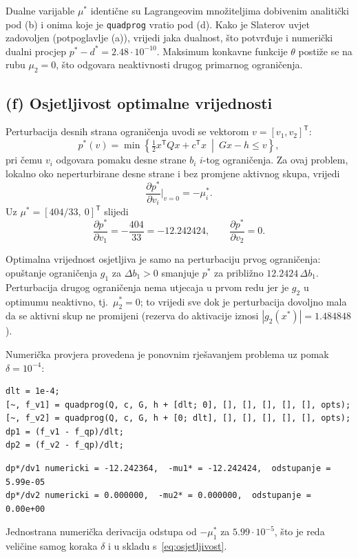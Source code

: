 Dualne varijable $\mu^*$ identične su Lagrangeovim množiteljima dobivenim analitički pod (b) i onima koje je \texttt{quadprog} vratio pod (d). Kako je Slaterov uvjet zadovoljen (potpoglavlje (a)), vrijedi jaka dualnost, što potvrđuje i numerički dualni procjep $p^* - d^* = 2.48 \cdot 10^{-10}$. Maksimum konkavne funkcije $\theta$ postiže se na rubu $\mu_2 = 0$, što odgovara neaktivnosti drugog primarnog ograničenja.

\subsection{(f) Osjetljivost optimalne vrijednosti}

Perturbacija desnih strana ograničenja uvodi se vektorom $v = [v_1, v_2]^{\mathsf{T}}$:
\begin{equation}
p^*(v) = \min \left\{ \tfrac{1}{2} x^{\mathsf{T}} Q x + c^{\mathsf{T}} x \ \middle| \ Gx - h \leq v \right\},
\end{equation}
pri čemu $v_i$ odgovara pomaku desne strane $b_i$ $i$-tog ograničenja. Za ovaj problem, lokalno oko neperturbirane desne strane i bez promjene aktivnog skupa, vrijedi~\cite[str.~34]{jokic2025dualnost}
\begin{equation}
\frac{\partial p^*}{\partial v_i}\bigg|_{v = 0} = -\mu_i^*.
\label{eq:osjetljivost}
\end{equation}
Uz $\mu^* = [404/33,\ 0]^{\mathsf{T}}$ slijedi
\begin{equation}
\frac{\partial p^*}{\partial v_1} = -\frac{404}{33} = -12.242424, \qquad
\frac{\partial p^*}{\partial v_2} = 0.
\end{equation}

Optimalna vrijednost osjetljiva je samo na perturbaciju prvog ograničenja: opuštanje ograničenja $g_1$ za $\Delta b_1 > 0$ smanjuje $p^*$ za približno $12.2424 \, \Delta b_1$. Perturbacija drugog ograničenja nema utjecaja u prvom redu jer je $g_2$ u optimumu neaktivno, tj.\ $\mu_2^* = 0$; to vrijedi sve dok je perturbacija dovoljno mala da se aktivni skup ne promijeni (rezerva do aktivacije iznosi $|g_2(x^*)| = 1.484848$).

Numerička provjera provedena je ponovnim rješavanjem problema uz pomak $\delta = 10^{-4}$:

\begin{lstlisting}
dlt = 1e-4;
[~, f_v1] = quadprog(Q, c, G, h + [dlt; 0], [], [], [], [], [], opts);
[~, f_v2] = quadprog(Q, c, G, h + [0; dlt], [], [], [], [], [], opts);
dp1 = (f_v1 - f_qp)/dlt;
dp2 = (f_v2 - f_qp)/dlt;
\end{lstlisting}

\begin{lstlisting}[style=outputstyle]
dp*/dv1 numericki = -12.242364,  -mu1* = -12.242424,  odstupanje = 5.99e-05
dp*/dv2 numericki = 0.000000,  -mu2* = 0.000000,  odstupanje = 0.00e+00
\end{lstlisting}

Jednostrana numerička derivacija odstupa od $-\mu_1^*$ za $5.99 \cdot 10^{-5}$, što je reda veličine samog koraka $\delta$ i u skladu s~\eqref{eq:osjetljivost}.

